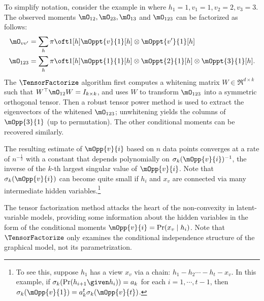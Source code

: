 To simplify notation, consider the example in  where $h_1=1,v_1=1,v_2=2,v_3=3$.
The observed moments $\mO_{12}, \mO_{23}, \mO_{13}$ and $\mO_{123}$ can be factorized as follows:
\begin{align*}
  \mO_{vv'} &= \sum_h {\pi \oft 1}[h] {\mOppt{v}{1}}[h] \otimes {\mOppt{v'}{1}}[h] \\ %
  \mO_{123} &= \sum_h {\pi \oft 1}[h] {\mOppt{1}{1}}[h] \otimes {\mOppt{2}{1}}[h] \otimes  {\mOppt{3}{1}}[h].
\end{align*}
The $\TensorFactorize$ algorithm first computes a whitening matrix $W \in
  \Re^{d \times k}$ such that $W^\top \mO_{12} W = I_{k \times k}$,
  and uses $W$ to transform $\mO_{123}$ into a symmetric orthogonal tensor.  
Then a robust tensor power method is used to extract the eigenvectors
of the whitened $\mO_{123}$; unwhitening yields the columns of $\mOpp{3}{1}$
(up to permutation).
The other conditional moments can be recovered similarly.

  The resulting estimate of %
  $\mOpp{v}{i}$ based on $n$ data points converges at a rate of $n^{-\frac12}$ with a constant
  that depends polynomially on $\sigma_k(\mOpp{v}{i})^{-1}$,
  the inverse of the $k$-th largest singular value of $\mOpp{v}{i}$.
Note that $\sigma_{k}(\mOpp{v}{i})$ can become quite
small if $h_i$ and $x_v$ are connected via many intermediate hidden
variables.\footnote{To see this, suppose $h_1$ has a view $x_v$ via a chain:
$h_1 - h_2 \cdots - h_t - x_v$. In this example, if
$\sigma_k(\Pr(h_{i+1} \given h_{i})) = a_k$ for each $i = 1,
\cdots, t-1$, then $\sigma_k(\mOpp{v}{1}) = a_k^t \sigma_k(\mOpp{v}{t})$.}

The tensor factorization method attacks the heart of the non-convexity
  in latent-variable models, providing some information about the hidden variables
  in the form of the conditional moments $\mOpp{v}{i} = \Pr(x_v \mid h_i)$.
  Note that $\TensorFactorize$ only examines the conditional independence structure
  of the graphical model, not its parametrization.

